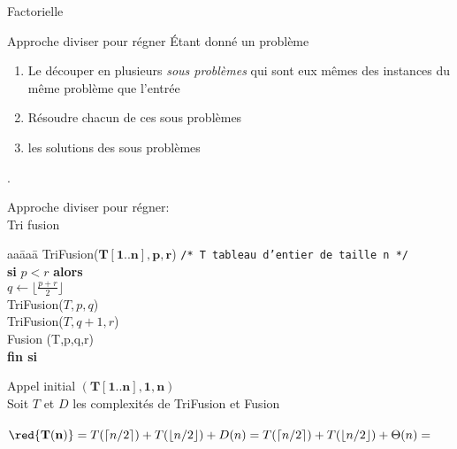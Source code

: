 \begin{frame}{Factorielle}
\end{frame}

\begin{frame}{Approche diviser pour régner}
Étant donné un problème 
  \begin{enumerate}
  \item Le découper en plusieurs \emph{sous problèmes} qui sont eux mêmes des instances {} du même problème que l'entrée
  \item Résoudre  chacun de ces sous problèmes
  \item {} les solutions des sous problèmes
  \end{enumerate}
  
 .
  \end{frame}




\begin{frame}{Approche diviser pour régner: \\
Tri fusion}
  \begin{tabbing}
    aa\=aaa\=\kill
    TriFusion($\mathbf{T[1..n],p,r}$) \hfill \texttt{/* T tableau d'entier de taille n */} \\
    \> \textbf{si} $p< r$ \textbf{alors} \\
    \> \>  $q \leftarrow \lfloor \frac{p+r}{2} \rfloor$ \\
    \> \>  TriFusion($T,p,q$)\\
    \> \>  TriFusion($T,q+1,r$)\\
    \> \>  Fusion (T,p,q,r)\\
  \> \textbf{fin si}
\end{tabbing}
Appel initial $\mathbf{(T[1..n],1,n)}$\\
Soit $T$ et $D$ les complexités de TriFusion et Fusion \\
~\\

  $\red{\mathbf{T(n)}} = T(\lceil n/2 \rceil) + T(\lfloor n/2 \rfloor) + D(n) =  T(\lceil n/2 \rceil) + T(\lfloor n/2 \rfloor) + \Theta(n) =$
\end{frame}


